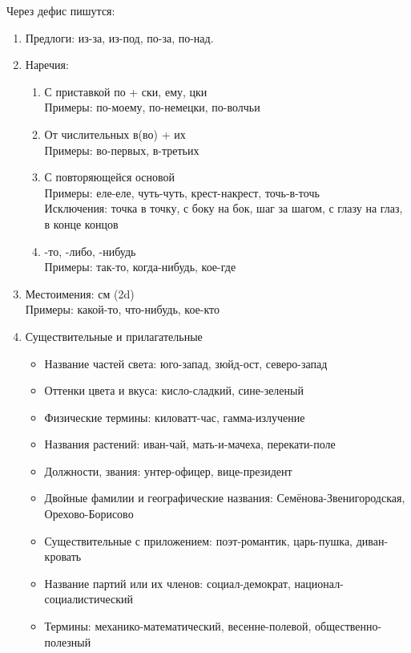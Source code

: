 \documentclass{article}
\begin{document}
Через дефис пишутся:
\begin{enumerate}
\item
  Предлоги: из-за, из-под, по-за, по-над.
\item
  Наречия:
  \begin{enumerate}
  \item
    С приставкой по + ски, ему, цки\\
    Примеры: по-моему, по-немецки, по-волчьи
  \item
    От числительных в(во) + их\\
    Примеры: во-первых, в-третьих
  \item
    С повторяющейся основой\\
    Примеры: еле-еле, чуть-чуть, крест-накрест, точь-в-точь\\
    Исключения: точка в точку, с боку на бок, шаг за шагом, с глазу на глаз, в конце концов
  \item
    -то, -либо, -нибудь\\
    Примеры: так-то, когда-нибудь, кое-где
  \end{enumerate}
\item
  Местоимения: см (2d)\\
  Примеры: какой-то, что-нибудь, кое-кто
\item
  Существительные и прилагательные
  \begin{itemize}
  \item
    Название частей света: юго-запад, зюйд-ост, северо-запад
  \item
    Оттенки цвета и вкуса: кисло-сладкий, сине-зеленый
  \item
    Физические термины: киловатт-час, гамма-излучение
  \item
    Названия растений: иван-чай, мать-и-мачеха, перекати-поле
  \item
    Должности, звания: унтер-офицер, вице-президент
  \item
    Двойные фамилии и географические названия: Семёнова-Звенигородская, Орехово-Борисово
  \item
    Существительные с приложением: поэт-романтик, царь-пушка, диван-кровать
  \item
    Название партий или их членов: социал-демократ, национал-социалистический
  \item
    Термины: механико-математический, весенне-полевой, общественно-полезный
  \end{itemize}
\end{enumerate}
\end{document}
